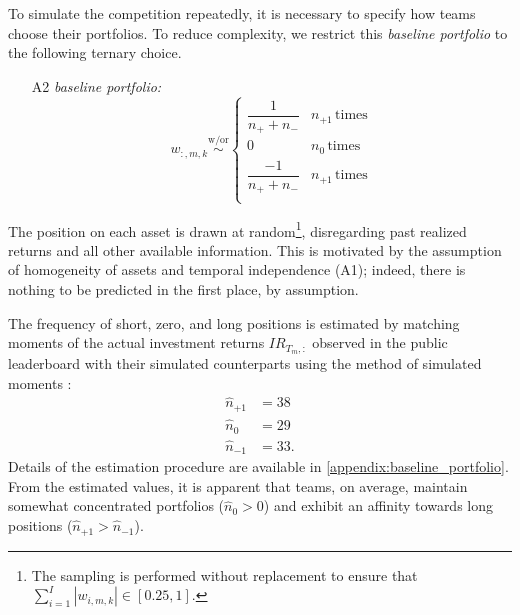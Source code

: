 \documentclass[3p,times,twocolumn]{elsarticle}
\begin{document}
To simulate the competition repeatedly, it is necessary to specify how teams choose their portfolios. 
To reduce complexity, we restrict this \emph{baseline portfolio} to the following ternary choice.
\begin{itemize}
    \item[A2]  \emph{baseline portfolio:}
        \begin{equation}\label{eq:baseline_portfolio}
            w_{:,m,k} \overset{\mathrm{w/or}}{\sim} \begin{cases}
                \dfrac{1}{n_{+}+n_{-}} & n_{+1}\, \text{times} \\
                0  & n_{0}\, \text{times}  \\
                \dfrac{-1}{n_{+}+n_{-}} & n_{+1}\, \text{times} \\
            \end{cases}
        \end{equation}
\end{itemize}
The position on each asset is drawn at random\footnote{
    The sampling is performed without replacement to ensure that $\sum_{i=1}^{I}|w_{i,m,k}| \in [0.25,1]$.
}, disregarding past realized returns and all other available information.
This is motivated by the assumption of homogeneity of assets and temporal independence (A1); indeed, there is nothing to be predicted in the first place, by assumption.

The frequency of short, zero, and long positions is estimated by matching moments of the actual investment returns $IR_{T_{m},:}$ observed in the public leaderboard with their simulated counterparts using the method of simulated moments \citep{mcfaddenMethodSimulatedMoments1989}:
\begin{equation}
    \begin{split}
        \hat{n}_{+1}&=38\\
        \hat{n}_{0}&=29\\
        \hat{n}_{-1}&=33.
    \end{split}
\end{equation}
Details of the estimation procedure are available in \ref{appendix:baseline_portfolio}.
From the estimated values, it is apparent that teams, on average, maintain somewhat concentrated portfolios ($\hat{n}_{0} > 0$) and exhibit an affinity towards long positions ($\hat{n}_{+1} > \hat{n}_{-1}$).
\end{document}
